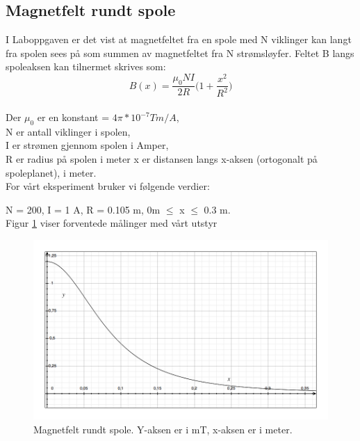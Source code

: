 \documentclass[12pt,norsk,a4paper]{article}
\begin{document}
\subsection{Magnetfelt rundt spole}
I Laboppgaven er det vist at magnetfeltet fra en spole med N viklinger kan langt fra spolen sees på som summen av magnetfeltet fra N strømsløyfer. Feltet B langs spoleaksen kan tilnermet skrives som:\\


\begin{equation}
    \label{eq:magnetfelt-spole}
    B(x) = \frac{\mu_0 N I}{2R} \Bigg(1 + \frac{x^2}{R^2} \Bigg) 
\end{equation}
\\
Der $\mu_0$ er en konstant = $4\pi * 10^{-7} Tm/A$, \\
N er antall viklinger i spolen,\\
I er strømen gjennom spolen i Amper,\\
R er radius på spolen i meter
x er distansen langs x-aksen (ortogonalt på spoleplanet), i meter.\\
For vårt eksperiment bruker vi følgende verdier:

N = 200, I = 1 A, R = 0.105 m,  0m $\le$ x $\le$ 0.3 m.\\
Figur \ref{fig:ideellgraf} viser forventede målinger med vårt utstyr


\begin{figure}[H]
\includegraphics[scale=0.5]{labrapport-teoridel-ligning1.jpg}
\caption{Magnetfelt rundt spole. Y-aksen er i mT, x-aksen er i meter.}
\label{fig:ideellgraf}
\end{figure}
\end{document}
